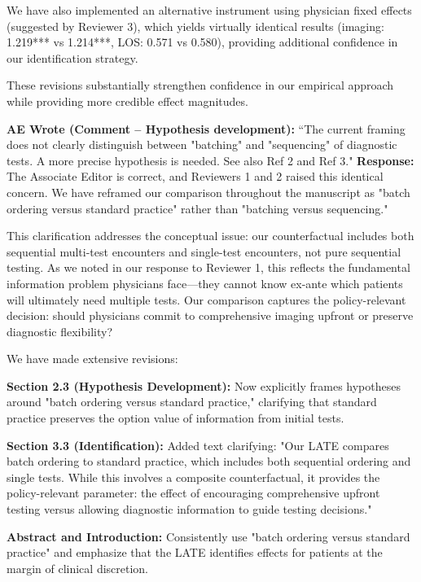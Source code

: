 \documentclass[11pt]{article}
\newenvironment{quote2}
{ \bigskip
\noindent
         \small\em
         \baselineskip=14pt
}
\newcommand{\1}{\hbox{\rm 1\kern-.35em 1}}
\begin{document}
We have also implemented an alternative instrument using physician fixed effects (suggested by Reviewer 3), which yields virtually identical results (imaging: 1.219*** vs 1.214***, LOS: 0.571 vs 0.580), providing additional confidence in our identification strategy.

These revisions substantially strengthen confidence in our empirical approach while providing more credible effect magnitudes.
\color{black}


\begin{quote2}
\textbf{AE Wrote (Comment – Hypothesis development):} 
\noindent``The current framing does not clearly distinguish between "batching" and "sequencing" of diagnostic tests. A more precise hypothesis is needed. See also Ref 2 and Ref 3."
\end{quote2}

\noindent\textbf{Response:} \color{blue}The Associate Editor is correct, and Reviewers 1 and 2 raised this identical concern. We have reframed our comparison throughout the manuscript as "batch ordering versus standard practice" rather than "batching versus sequencing."

This clarification addresses the conceptual issue: our counterfactual includes both sequential multi-test encounters and single-test encounters, not pure sequential testing. As we noted in our response to Reviewer 1, this reflects the fundamental information problem physicians face—they cannot know ex-ante which patients will ultimately need multiple tests. Our comparison captures the policy-relevant decision: should physicians commit to comprehensive imaging upfront or preserve diagnostic flexibility?

We have made extensive revisions:

\textbf{Section 2.3 (Hypothesis Development):} Now explicitly frames hypotheses around "batch ordering versus standard practice," clarifying that standard practice preserves the option value of information from initial tests.

\textbf{Section 3.3 (Identification):} Added text clarifying: "Our LATE compares batch ordering to standard practice, which includes both sequential ordering and single tests. While this involves a composite counterfactual, it provides the policy-relevant parameter: the effect of encouraging comprehensive upfront testing versus allowing diagnostic information to guide testing decisions."

\textbf{Abstract and Introduction:} Consistently use "batch ordering versus standard practice" and emphasize that the LATE identifies effects for patients at the margin of clinical discretion.
\end{document}
